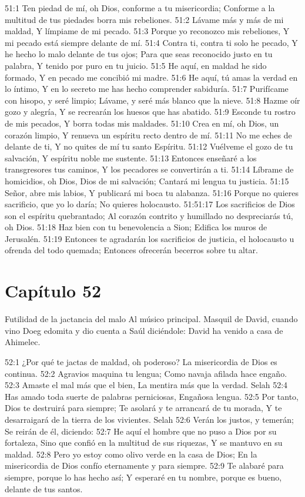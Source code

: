 51:1 Ten piedad de mí, oh Dios, conforme a tu misericordia; 
Conforme a la multitud de tus piedades borra mis rebeliones. 
51:2 Lávame más y más de mi maldad, 
Y límpiame de mi pecado. 
51:3 Porque yo reconozco mis rebeliones, 
Y mi pecado está siempre delante de mí. 
51:4 Contra ti, contra ti solo he pecado, 
Y he hecho lo malo delante de tus ojos; 
Para que seas reconocido justo en tu palabra, 
Y tenido por puro en tu juicio. 
51:5 He aquí, en maldad he sido formado, 
Y en pecado me concibió mi madre. 
51:6 He aquí, tú amas la verdad en lo íntimo, 
Y en lo secreto me has hecho comprender sabiduría. 
51:7 Purifícame con hisopo, y seré limpio; 
Lávame, y seré más blanco que la nieve. 
51:8 Hazme oír gozo y alegría, 
Y se recrearán los huesos que has abatido. 
51:9 Esconde tu rostro de mis pecados, 
Y borra todas mis maldades. 
51:10 Crea en mí, oh Dios, un corazón limpio, 
Y renueva un espíritu recto dentro de mí. 
51:11 No me eches de delante de ti, 
Y no quites de mí tu santo Espíritu. 
51:12 Vuélveme el gozo de tu salvación, 
Y espíritu noble me sustente. 
51:13 Entonces enseñaré a los transgresores tus caminos, 
Y los pecadores se convertirán a ti. 
51:14 Líbrame de homicidios, oh Dios, Dios de mi salvación; 
Cantará mi lengua tu justicia. 
51:15 Señor, abre mis labios, 
Y publicará mi boca tu alabanza. 
51:16 Porque no quieres sacrificio, que yo lo daría; 
No quieres holocausto. 
51:51:17 Los sacrificios de Dios son el espíritu quebrantado; 
Al corazón contrito y humillado no despreciarás tú, oh Dios. 
51:18 Haz bien con tu benevolencia a Sion; 
Edifica los muros de Jerusalén. 
51:19 Entonces te agradarán los sacrificios de justicia, 
el holocausto u ofrenda del todo quemada; 
Entonces ofrecerán becerros sobre tu altar. 
\section*{Capítulo 52}
Futilidad de la jactancia del malo 
Al músico principal. Masquil de David, cuando vino Doeg edomita y dio cuenta a Saúl diciéndole: David ha venido a casa de Ahimelec. 
 
52:1 ¿Por qué te jactas de maldad, oh poderoso? 
La misericordia de Dios es continua. 
52:2 Agravios maquina tu lengua; 
Como navaja afilada hace engaño. 
52:3 Amaste el mal más que el bien, 
La mentira más que la verdad. Selah 
52:4 Has amado toda suerte de palabras perniciosas, 
Engañosa lengua. 
52:5 Por tanto, Dios te destruirá para siempre; 
Te asolará y te arrancará de tu morada, 
Y te desarraigará de la tierra de los vivientes. Selah 
52:6 Verán los justos, y temerán; 
Se reirán de él, diciendo: 
52:7 He aquí el hombre que no puso a Dios por su fortaleza, 
Sino que confió en la multitud de sus riquezas, 
Y se mantuvo en su maldad. 
52:8 Pero yo estoy como olivo verde en la casa de Dios; 
En la misericordia de Dios confío eternamente y para siempre. 
52:9 Te alabaré para siempre, porque lo has hecho así; 
Y esperaré en tu nombre, porque es bueno, delante de tus santos. 
